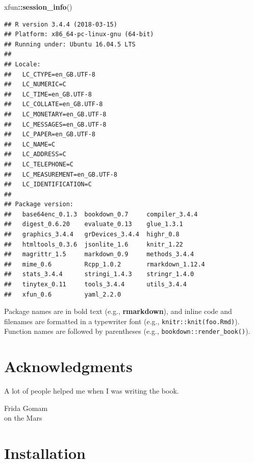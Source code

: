 \documentclass[12pt,]{krantz}
\makeatletter
\newenvironment{Shaded}{\begin{snugshade}}{\end{snugshade}}
\newcommand{\KeywordTok}[1]{\textcolor[rgb]{0.13,0.29,0.53}{\textbf{#1}}}
\newcommand{\NormalTok}[1]{#1}
\newcommand{\OperatorTok}[1]{\textcolor[rgb]{0.81,0.36,0.00}{\textbf{#1}}}
\newenvironment{kframe}{%
\medskip{}
\setlength{\fboxsep}{.8em}
 \def\at@end@of@kframe{}%
 \ifinner\ifhmode%
  \def\at@end@of@kframe{\end{minipage}}%
  \begin{minipage}{\columnwidth}%
 \fi\fi%
 \def\FrameCommand##1{\hskip\@totalleftmargin \hskip-\fboxsep
 \colorbox{shadecolor}{##1}\hskip-\fboxsep
     \hskip-\linewidth \hskip-\@totalleftmargin \hskip\columnwidth}%
 \MakeFramed {\advance\hsize-\width
   \@totalleftmargin\z@ \linewidth\hsize
   \@setminipage}}%
 {\par\unskip\endMakeFramed%
 \at@end@of@kframe}
\renewenvironment{Shaded}{\begin{kframe}}{\end{kframe}}
\theoremstyle{definition}
\theoremstyle{definition}
\theoremstyle{definition}
\theoremstyle{remark}
\let\BeginKnitrBlock\begin \let\EndKnitrBlock\end
\makeatother
\begin{document}
\begin{Shaded}
\begin{Highlighting}[]
\NormalTok{xfun}\OperatorTok{::}\KeywordTok{session_info}\NormalTok{()}
\end{Highlighting}
\end{Shaded}

\begin{verbatim}
## R version 3.4.4 (2018-03-15)
## Platform: x86_64-pc-linux-gnu (64-bit)
## Running under: Ubuntu 16.04.5 LTS
## 
## Locale:
##   LC_CTYPE=en_GB.UTF-8      
##   LC_NUMERIC=C              
##   LC_TIME=en_GB.UTF-8       
##   LC_COLLATE=en_GB.UTF-8    
##   LC_MONETARY=en_GB.UTF-8   
##   LC_MESSAGES=en_GB.UTF-8   
##   LC_PAPER=en_GB.UTF-8      
##   LC_NAME=C                 
##   LC_ADDRESS=C              
##   LC_TELEPHONE=C            
##   LC_MEASUREMENT=en_GB.UTF-8
##   LC_IDENTIFICATION=C       
## 
## Package version:
##   base64enc_0.1.3  bookdown_0.7     compiler_3.4.4  
##   digest_0.6.20    evaluate_0.13    glue_1.3.1      
##   graphics_3.4.4   grDevices_3.4.4  highr_0.8       
##   htmltools_0.3.6  jsonlite_1.6     knitr_1.22      
##   magrittr_1.5     markdown_0.9     methods_3.4.4   
##   mime_0.6         Rcpp_1.0.2       rmarkdown_1.12.4
##   stats_3.4.4      stringi_1.4.3    stringr_1.4.0   
##   tinytex_0.11     tools_3.4.4      utils_3.4.4     
##   xfun_0.6         yaml_2.2.0
\end{verbatim}

Package names are in bold text (e.g., \textbf{rmarkdown}), and inline
code and filenames are formatted in a typewriter font (e.g.,
\texttt{knitr::knit(\textquotesingle{}foo.Rmd\textquotesingle{})}).
Function names are followed by parentheses (e.g.,
\texttt{bookdown::render\_book()}).

\hypertarget{acknowledgments}{%
\section*{Acknowledgments}\label{acknowledgments}}


A lot of people helped me when I was writing the book.

\BeginKnitrBlock{flushright}
Frida Gomam\\
on the Mars
\EndKnitrBlock{flushright}

\hypertarget{installation}{%
\section*{Installation}\label{installation}}
\end{document}
